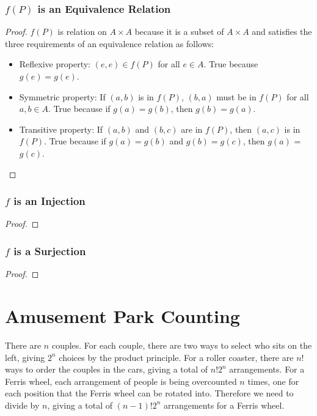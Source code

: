 \documentclass[12pt]{article}
\begin{document}
\subsubsection*{$f(P)$ is an Equivalence Relation}
\begin{proof}
$f(P)$ is relation on $A\times A$ because it is a subset of $A\times A$ and satisfies the three requirements of an equivalence relation as follows:
\begin{itemize}
\item Reflexive property: $(e, e) \in f(P)$ for all $e \in A$. True because $g(e) = g(e)$.    
\item Symmetric property: If $(a, b)$ is in $f(P)$, $(b, a)$ must be in $f(P)$ for all $a, b \in A$. True because if $g(a) = g(b)$, then $g(b) = g(a)$.
\item Transitive property: If $(a,b)$ and $(b,c)$ are in $f(P)$, then $(a,c)$ is in  $f(P)$. True because if $g(a) = g(b)$ and $g(b) = g(c)$, then $g(a)$ = $g(c)$.
\end{itemize}

\end{proof}
\subsubsection*{$f$ is an Injection}
\begin{proof}

\end{proof}
\subsubsection*{$f$ is a Surjection}
\begin{proof}
    
\end{proof}



\section{Amusement Park Counting}

There are $n$ couples. For each couple, there are two ways to select who sits on the left, giving $2^n$ choices by the product principle. For a roller coaster, there are $n!$ ways to order the couples in the cars, giving a total of $n!2^n$ arrangements. For a Ferris wheel, each arrangement of people is being overcounted $n$ times, one for each position that the Ferris wheel can be rotated into. Therefore we need to divide by $n$, giving a total of $(n-1)!2^n$ arrangements for a Ferris wheel.
\end{document}
